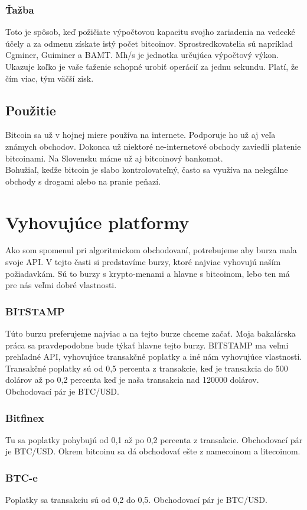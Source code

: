 \subsubsection{Ťažba} 
Toto je spôsob, keď požičiate výpočtovou kapacitu svojho zariadenia na vedecké účely a za odmenu získate istý počet bitcoinov. 
 Sprostredkovatelia sú napríklad  Cgminer, Guiminer a BAMT. Mh/s je jednotka určujúca výpočtový výkon. Ukazuje koľko je vaše ťaženie schopné urobiť operácií za jednu sekundu. Platí, že čím viac, tým väčší zisk.
\subsection{Použitie} 
Bitcoin sa už v hojnej miere používa na internete. Podporuje ho už aj veľa známych obchodov. Dokonca už niektoré ne-internetové obchody zaviedli platenie bitcoinami. Na Slovensku máme už aj bitcoinový bankomat. 
 \\
Bohužiaľ, keďže bitcoin je slabo kontrolovateľný, často sa využíva na nelegálne obchody s drogami alebo na pranie peňazí. \cite{B}
\section{Vyhovujúce platformy} 
Ako som spomenul pri algoritmickom obchodovaní, potrebujeme aby burza mala svoje API. V tejto časti si predstavíme burzy, ktoré najviac vyhovujú naším požiadavkám. Sú to burzy s krypto-menami a hlavne s bitcoinom, lebo ten má pre nás veľmi dobré vlastnosti. 
\subsubsection{BITSTAMP} 
Túto burzu preferujeme najviac a na tejto burze chceme začať. Moja bakalárska práca sa pravdepodobne bude týkať hlavne tejto burzy. BITSTAMP ma veľmi prehľadné API, vyhovujúce transakčné poplatky a iné nám vyhovujúce vlastnosti. Transakčné poplatky sú od 0,5 percenta z transakcie, keď je transakcia do 500 dolárov až po 0,2 percenta keď je naša transakcia nad 120000 dolárov. Obchodovací pár je BTC/USD. \cite{Bit} 
\subsubsection{Bitfinex} 
Tu sa poplatky pohybujú od 0,1 až po 0,2 percenta z transakcie. Obchodovací pár je BTC/USD. Okrem bitcoinu sa dá obchodovať ešte z namecoinom a litecoinom. \cite{Bitf} 
\subsubsection{BTC-e} 
Poplatky sa transakciu sú od 0,2 do 0,5. Obchodovací pár je BTC/USD. \cite{BTC} 
